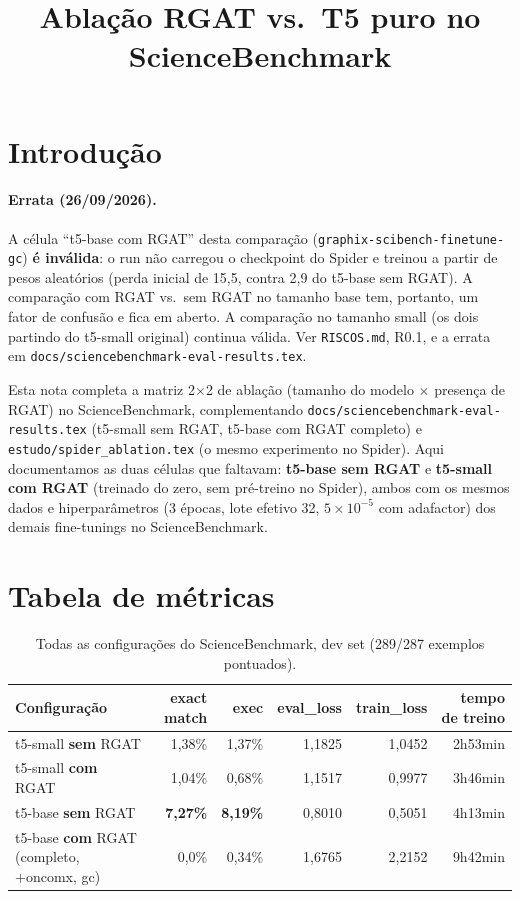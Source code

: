 \documentclass{article}
\title{Ablação RGAT vs.\ T5 puro no ScienceBenchmark}
\author{}
\date{}
\begin{document}
\maketitle

\section{Introdução}

\paragraph{Errata (26/09/2026).} A célula ``t5-base com RGAT'' desta
comparação (\texttt{graphix-scibench-finetune-gc}) \textbf{é inválida}: o run
não carregou o checkpoint do Spider e treinou a partir de pesos aleatórios
(perda inicial de 15,5, contra 2,9 do t5-base sem RGAT). A comparação com
RGAT vs.\ sem RGAT no tamanho base tem, portanto, um fator de confusão e fica
em aberto. A comparação no tamanho small (os dois partindo do t5-small
original) continua válida. Ver \texttt{RISCOS.md}, R0.1, e a errata em
\texttt{docs/sciencebenchmark-eval-results.tex}.


Esta nota completa a matriz 2$\times$2 de ablação (tamanho do modelo
$\times$ presença de RGAT) no ScienceBenchmark, complementando
\texttt{docs/sciencebenchmark-eval-results.tex} (t5-small sem RGAT,
t5-base com RGAT completo) e \texttt{estudo/spider\_ablation.tex} (o
mesmo experimento no Spider). Aqui documentamos as duas células que
faltavam: \textbf{t5-base sem RGAT} e \textbf{t5-small com RGAT}
(treinado do zero, sem pré-treino no Spider), ambos com os mesmos dados
e hiperparâmetros (3 épocas, lote efetivo 32, $5\times10^{-5}$ com
adafactor) dos demais fine-tunings no ScienceBenchmark.

\section{Tabela de métricas}

\begin{table}[h]
\centering
\caption{Todas as configurações do ScienceBenchmark, dev set (289/287 exemplos pontuados).}
\label{tab:scibench-ablation}
\begin{tabular}{lrrrrr}
\toprule
\textbf{Configuração} & \textbf{exact match} & \textbf{exec} & \textbf{eval\_loss} & \textbf{train\_loss} & \textbf{tempo de treino} \\
\midrule
t5-small \textbf{sem} RGAT      & 1,38\% & 1,37\% & 1,1825 & 1,0452 & 2h53min \\
t5-small \textbf{com} RGAT       & 1,04\% & 0,68\% & 1,1517 & 0,9977 & 3h46min \\
t5-base \textbf{sem} RGAT        & \textbf{7,27\%} & \textbf{8,19\%} & 0,8010 & 0,5051 & 4h13min \\
t5-base \textbf{com} RGAT (completo, +oncomx, gc) & 0,0\% & 0,34\% & 1,6765 & 2,2152 & 9h42min \\
\bottomrule
\end{tabular}
\end{table}
\end{document}
